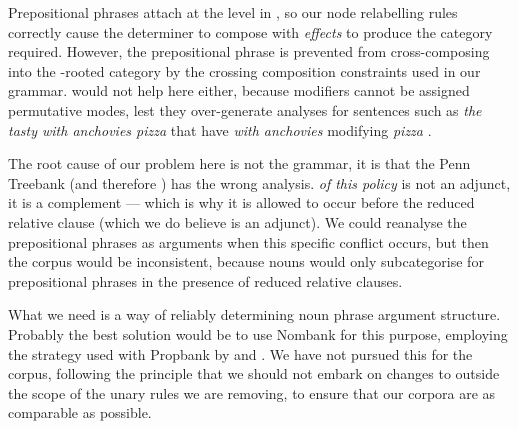 \begin{center}
\small
{}
\end{center}

Prepositional phrases attach at the  level in \ccgbank, so our node
relabelling rules correctly cause the determiner to compose with \emph{effects}
to produce the  category required. However, the prepositional
phrase is prevented from cross-composing into the -rooted category by the
\citet{steedman:00} crossing composition constraints used in our grammar. \mmccg
would not help here either, because  modifiers cannot be assigned
permutative modes, lest they over-generate analyses for sentences such as
\emph{the tasty with anchovies pizza} that have \emph{with anchovies} modifying
\emph{pizza} \citep{baldridge:03}.

The root cause of our problem here is not the grammar, it is that the Penn
Treebank (and therefore \ccgbank) has the wrong analysis. \emph{of this policy}
is not an adjunct, it is a complement --- which is why it is allowed to occur
before the reduced relative clause (which we do believe is an adjunct). We could
reanalyse the prepositional phrases as arguments when this specific conflict
occurs, but then the corpus would be inconsistent, because nouns would only
subcategorise for prepositional phrases in the presence of reduced relative
clauses.

What we need is a way of reliably determining noun phrase argument structure.
Probably the best solution would be to use Nombank \citep{nombank} for this
purpose, employing the strategy used with Propbank by
\citet{honnibal:pacling07prop} and \citet{boxwell:08}. We have not pursued this
for the \nounary corpus, following the principle that we should not embark on
changes to \ccgbank outside the scope of the unary rules we are removing, to
ensure that our corpora are as comparable as possible.

